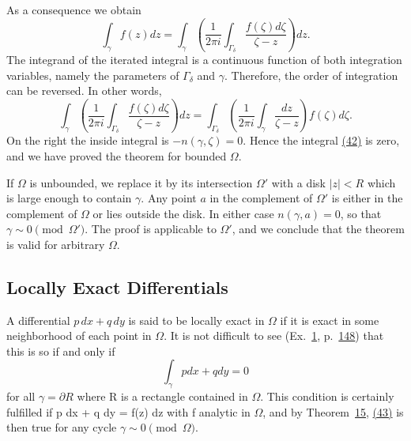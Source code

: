 As a consequence we obtain
\begin{equation*}
\int_ {\gamma} f (z) d z = \int_ {\gamma} \left(\frac {1}{2 \pi i} \int_ {\Gamma_ {\delta}} \frac {f (\zeta) d \zeta}{\zeta - z}\right) d z.\tag{42}\label{eq:4.42}
\end{equation*}
The integrand of the iterated integral is a continuous function of both integration variables, namely the parameters of $\Gamma_{\delta}$ and $\gamma$. Therefore, the
order of integration can be reversed. In other words,
\begin{equation*}
\int_ {\gamma} \left(\frac {1}{2 \pi i} \int_ {\Gamma_ {\delta}} \frac {f (\zeta) d \zeta}{\zeta - z}\right) d z = \int_ {\Gamma_ {\delta}} \left(\frac {1}{2 \pi i} \int_ {\gamma} \frac {d z}{\zeta - z}\right) f (\zeta) d \zeta .
\end{equation*}
On the right the inside integral is $-n(\gamma,\zeta)=0$. Hence the integral \hyperref[eq:4.42]{(42)} is zero, and we have proved the theorem for bounded $\Omega$.

If $\Omega$ is unbounded, we replace it by its intersection $\Omega'$ with a disk $|z| < R$ which is large enough to contain $\gamma$. Any point $a$ in the complement of $\Omega'$ is either in the complement of $\Omega$ or lies outside the disk. In either case $n(\gamma, a) = 0$, so that $\gamma \sim 0 \pmod{\Omega'}$. The proof is applicable to $\Omega'$, and we conclude that the theorem is valid for arbitrary $\Omega$.

\setcounter{section}{4}\setcounter{subsection}{5}\subsection{Locally Exact Differentials}\label{sec:4.4.6}
A differential $p \, dx + q \, dy$ is said to be locally exact in $\Omega$ if it is exact in some neighborhood of each point in $\Omega$. It is not difficult to see (Ex.~\hyperref[exercise:4.4.7.8.1]{1}, p.~\hyperlink{orig-p148}{148}) that this is so if and only if
\begin{equation*}
\int_ {\gamma} p d x + q d y = 0\tag{43}\label{eq:4.43}
\end{equation*}
for all $\gamma = \partial R$ where R is a rectangle contained in $\Omega$. This condition is certainly fulfilled if p dx + q dy = f(z) dz with f analytic in $\Omega$, and by Theorem~\hyperref[thm:4.15]{15}, \hyperref[eq:4.43]{(43)} is then true for any cycle $\gamma \sim 0 \pmod{\Omega}$.

